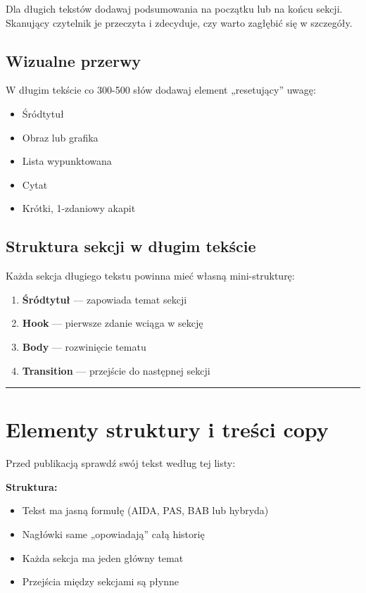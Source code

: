 \documentclass[
  12pt,
  a4paper,
  twoside,
  openright,
  12pt,
  DIV=12,
  BCOR=12mm]{scrbook}
\providecommand{\tightlist}{%
  \setlength{\itemsep}{0pt}\setlength{\parskip}{0pt}}\usepackage{longtable,booktabs,array}
\newcommand{\decoline}{%
  \begin{center}
    \textcolor{bordergray}{\rule{0.3\textwidth}{0.5pt}}
  \end{center}
}
\begin{document}
Dla długich tekstów dodawaj podsumowania na początku lub na końcu
sekcji. Skanujący czytelnik je przeczyta i zdecyduje, czy warto zagłębić
się w szczegóły.

\subsection{Wizualne przerwy}\label{wizualne-przerwy}

W długim tekście co 300-500 słów dodawaj element „resetujący'' uwagę:

\begin{itemize}
\tightlist
\item
  Śródtytuł
\item
  Obraz lub grafika
\item
  Lista wypunktowana
\item
  Cytat
\item
  Krótki, 1-zdaniowy akapit
\end{itemize}

\subsection{Struktura sekcji w długim
tekście}\label{struktura-sekcji-w-dux142ugim-tekux15bcie}

Każda sekcja długiego tekstu powinna mieć własną mini-strukturę:

\begin{enumerate}
\def\labelenumi{\arabic{enumi}.}
\tightlist
\item
  \textbf{Śródtytuł} --- zapowiada temat sekcji
\item
  \textbf{Hook} --- pierwsze zdanie wciąga w sekcję
\item
  \textbf{Body} --- rozwinięcie tematu
\item
  \textbf{Transition} --- przejście do następnej sekcji
\end{enumerate}

\decoline

\section{Elementy struktury i treści
copy}\label{elementy-struktury-i-treux15bci-copy}

Przed publikacją sprawdź swój tekst według tej listy:

\textbf{Struktura:}

\begin{itemize}
\tightlist
\item[$\square$]
  Tekst ma jasną formułę (AIDA, PAS, BAB lub hybryda)
\item[$\square$]
  Nagłówki same „opowiadają'' całą historię
\item[$\square$]
  Każda sekcja ma jeden główny temat
\item[$\square$]
  Przejścia między sekcjami są płynne
\end{itemize}
\end{document}
